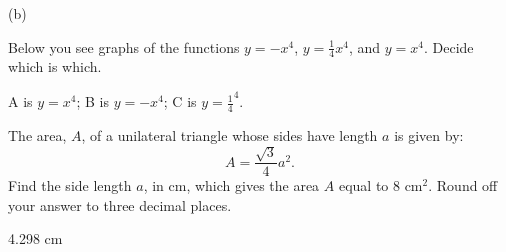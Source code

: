 \begin{solution}
(b)
\end{solution}

\begin{exercise}
Below you see graphs of the functions $y=-x^4$,   $y=\frac{1}{4}x^4$, and  $y=x^4$. Decide which is which.

\begin{center}
\end{center}
\end{exercise}

\begin{solution}
A is $y=x^4$; B is $y=-x^4$; C is $y=\frac{1}{4}^4$.
\end{solution}

\begin{exercise}
The area, $A$, of a unilateral triangle whose sides have length $a$ is given by:
\[
A=\frac{\sqrt{3}}{4}a^2
.\]
Find the side length $a$, in cm, which gives the area $A$ equal to $8 \text{ cm}^2$. Round off your answer to three decimal places.
\end{exercise}

\begin{solution}
4.298 cm
\end{solution}